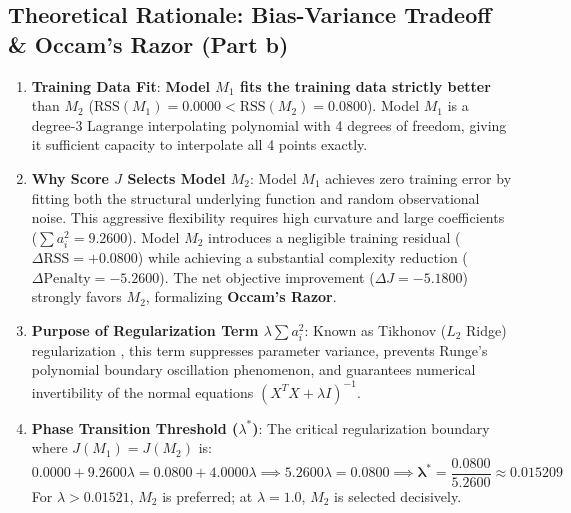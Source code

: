 \documentclass[11pt,a4paper]{article}
\theoremstyle{definition}
\theoremstyle{plain}
\theoremstyle{remark}
\begin{document}
\subsection{Theoretical Rationale: Bias-Variance Tradeoff \& Occam's Razor (Part b)}
\begin{enumerate}
    \item \textbf{Training Data Fit}: \textbf{Model $M_1$ fits the training data strictly better} than $M_2$ ($\text{RSS}(M_1) = 0.0000 < \text{RSS}(M_2) = 0.0800$). Model $M_1$ is a degree-3 Lagrange interpolating polynomial with 4 degrees of freedom, giving it sufficient capacity to interpolate all 4 points exactly.
    \item \textbf{Why Score $J$ Selects Model $M_2$}: Model $M_1$ achieves zero training error by fitting both the structural underlying function and random observational noise. This aggressive flexibility requires high curvature and large coefficients ($\sum a_i^2 = 9.2600$). Model $M_2$ introduces a negligible training residual ($\Delta \text{RSS} = +0.0800$) while achieving a substantial complexity reduction ($\Delta \text{Penalty} = -5.2600$). The net objective improvement ($\Delta J = -5.1800$) strongly favors $M_2$, formalizing \textbf{Occam's Razor}.
    \item \textbf{Purpose of Regularization Term $\lambda \sum a_i^2$}: Known as Tikhonov ($L_2$ Ridge) regularization \cite{tikhonov1977solutions}, this term suppresses parameter variance, prevents Runge's polynomial boundary oscillation phenomenon, and guarantees numerical invertibility of the normal equations $(X^TX + \lambda I)^{-1}$.
    \item \textbf{Phase Transition Threshold ($\lambda^*$)}: The critical regularization boundary where $J(M_1) = J(M_2)$ is:
    \begin{equation}
    0.0000 + 9.2600 \lambda = 0.0800 + 4.0000 \lambda \implies 5.2600 \lambda = 0.0800 \implies \mathbf{\lambda^* = \frac{0.0800}{5.2600} \approx 0.015209}
    \end{equation}
    For $\lambda > 0.01521$, $M_2$ is preferred; at $\lambda = 1.0$, $M_2$ is selected decisively.
\end{enumerate}
\end{document}
